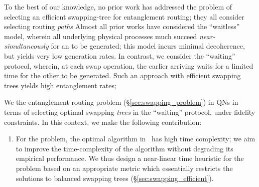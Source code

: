 To the best of our knowledge, no prior work has addressed the problem of selecting an efficient
swapping-tree for entanglement routing; they all consider selecting routing \textit{paths} 
Almost all prior works have considered the ``waitless''
model, wherein all underlying physical processes much succeed \textit{near-simultaneously} for 
an \eps to be generated; this model incurs minimal decoherence, but yields
very low \eps generation rates. 
In contrast, we consider the ``waiting'' protocol, wherein, at each swap operation, the earlier arriving 
\eps waits for a limited time for the other \eps to be generated. Such an approach with efficient swapping trees yields high entanglement rates; 

We  the entanglement routing problem (\S\ref{sec:swapping_problem})
in QNs in terms of selecting optimal swapping \textit{trees} in the ``waiting'' protocol, under fidelity
constraints. In this context, we make the following contribution:
\begin{enumerate}

\item
For the \spp problem, the optimal algorithm in~\cite{swapping-tqe-22} has high time complexity; 
we aim to improve the time-complexity of the algorithm without degrading its empirical performance.
We thus design a near-linear time heuristic for the \spp problem based on an appropriate metric 
which essentially restricts the solutions to balanced swapping trees (\S\ref{sec:swapping_efficient}).

\end{enumerate}


